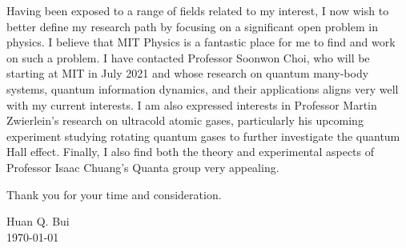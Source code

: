 \documentclass[12pt]{article}
\begin{document}
Having been exposed to a range of fields related to my  interest, I now wish to better define my research path by focusing on a significant open problem in physics. I believe that MIT Physics is a fantastic place for me to find and work on such a problem. I have contacted Professor Soonwon Choi, who will be starting at MIT in July 2021 and whose research on quantum many-body systems, quantum information dynamics, and their applications aligns very well with my current interests. I am also expressed interests in Professor Martin Zwierlein's research on ultracold atomic gases, particularly his upcoming experiment studying rotating quantum gases to further investigate the quantum Hall effect. Finally, I also find both the theory and experimental aspects of Professor Isaac Chuang's Quanta group very appealing.  \\ \vspace{-9pt}

\noindent Thank you for your time and consideration.\\ \vspace{-9pt}

\noindent Huan Q. Bui\\
\today


%	
%	 

	

















	
	
	
	
	
\end{document}
